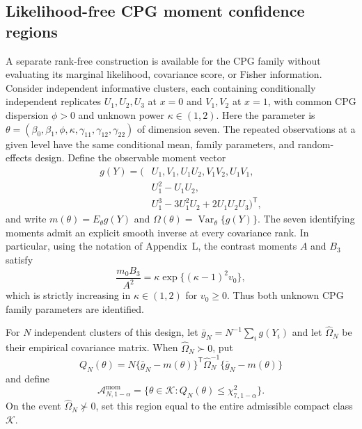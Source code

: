 \subsection{Likelihood-free CPG moment confidence regions}
\label{subsec:ci-cpg-moments}

A separate rank-free construction is available for the CPG family
without evaluating its marginal likelihood, covariance score, or
Fisher information. Consider independent informative clusters, each
containing conditionally independent replicates $U_1,U_2,U_3$ at
$x=0$ and $V_1,V_2$ at $x=1$, with common CPG dispersion $\phi>0$
and unknown power $\kappa\in(1,2)$. Here the parameter is
$\theta=(\beta_0,\beta_1,\phi,\kappa,
\gamma_{11},\gamma_{12},\gamma_{22})$ of dimension seven.
The repeated observations at a given level have the same conditional
mean, family parameters, and random-effects design.
Define the observable moment vector
\begin{equation}\label{eq:sec8-cpg-moments}
\begin{aligned}
g(Y)=(&U_1,V_1,U_1U_2,V_1V_2,U_1V_1,\\
     &U_1^2-U_1U_2,\\
     &U_1^3-3U_1^2U_2+2U_1U_2U_3)^{\mathsf T},
\end{aligned}
\end{equation}
and write $m(\theta)=E_\theta g(Y)$ and
$\Omega(\theta)=\operatorname{Var}_\theta\{g(Y)\}$.
The seven identifying moments admit an explicit smooth inverse at
every covariance rank. In particular, using the notation of
Appendix~L, the contrast moments $A$ and $B_3$ satisfy
\begin{equation}\label{eq:sec8-cpg-inverse}
\frac{m_0B_3}{A^2}
=\kappa\exp\{(\kappa-1)^2v_0\},
\end{equation}
which is strictly increasing in $\kappa\in(1,2)$ for $v_0\ge0$.
Thus both unknown CPG family parameters are identified.

For $N$ independent clusters of this design, let
$\bar g_N=N^{-1}\sum_i g(Y_i)$ and let $\widehat\Omega_N$
be their empirical covariance matrix. When
$\widehat\Omega_N\succ0$, put
\begin{equation}\label{eq:sec8-cpg-stat}
Q_N(\theta)=N\{\bar g_N-m(\theta)\}^{\mathsf T}
\widehat\Omega_N^{-1}\{\bar g_N-m(\theta)\}
\end{equation}
and define
\begin{equation}\label{eq:sec8-cpg-region}
\mathcal A_{N,1-\alpha}^{\mathrm{mom}}
=\{\theta\in\mathcal K:Q_N(\theta)
\le\chi^2_{7,1-\alpha}\}.
\end{equation}
On the event $\widehat\Omega_N\not\succ0$, set this region equal
to the entire admissible compact class $\mathcal K$.

